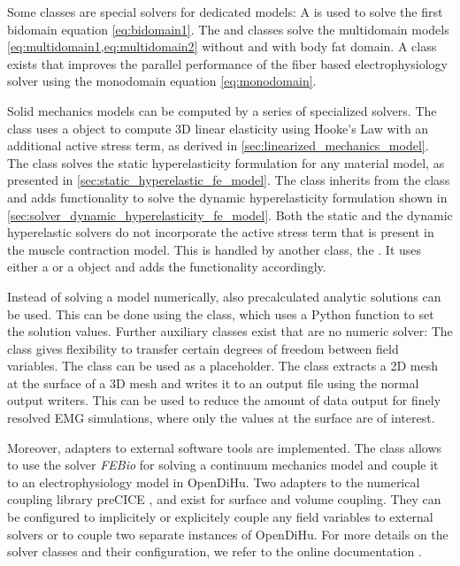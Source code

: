 Some classes are special solvers for dedicated models: A  is used to solve the first bidomain equation \cref{eq:bidomain1}. The  and  classes solve the multidomain models \cref{eq:multidomain1,eq:multidomain2} without and with body fat domain. A class  exists that improves the parallel performance of the fiber based electrophysiology solver using the monodomain equation \cref{eq:monodomain}.

Solid mechanics models can be computed by a series of specialized solvers. The  class uses a  object to compute 3D linear elasticity using Hooke's Law with an additional active stress term, as derived in \cref{sec:linearized_mechanics_model}. The  class solves the static hyperelasticity formulation for any material model, as presented in \cref{sec:static_hyperelastic_fe_model}. The  class inherits from the  class and adds functionality to solve the dynamic hyperelasticity formulation shown in \cref{sec:solver_dynamic_hyperelasticity_fe_model}. 
Both the static and the dynamic hyperelastic solvers do not incorporate the active stress term that is present in the muscle contraction model. This is handled by another class, the . It uses either a  or a  object and adds the functionality accordingly.

Instead of solving a model numerically, also precalculated analytic solutions can be used. This can be done using the  class, which uses a Python function to set the solution values. Further auxiliary classes exist that are no numeric solver: The  class gives flexibility to transfer certain degrees of freedom between field variables. The  class can be used as a placeholder. The  class extracts a 2D mesh at the surface of a 3D mesh and writes it to an output file using the normal output writers. This can be used to reduce the amount of data output for finely resolved EMG simulations, where only the values at the surface are of interest.

Moreover, adapters to external software tools are implemented. The class  allows to use the solver \emph{FEBio} \cite{Maas2012,maas2017febio} for solving a continuum mechanics model and couple it to an electrophysiology model in OpenDiHu.
Two adapters to the numerical coupling library preCICE \cite{precice},  and  exist for surface and volume coupling. They can be configured to implicitely or explicitely couple any field variables to external solvers or to couple two separate instances of OpenDiHu.
For more details on the solver classes and their configuration, we refer to the online documentation \cite{opendihuWeb}.

